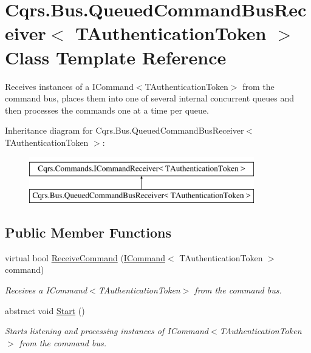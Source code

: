 \hypertarget{classCqrs_1_1Bus_1_1QueuedCommandBusReceiver}{}\section{Cqrs.\+Bus.\+Queued\+Command\+Bus\+Receiver$<$ T\+Authentication\+Token $>$ Class Template Reference}
\label{classCqrs_1_1Bus_1_1QueuedCommandBusReceiver}


Receives instances of a I\+Command$<$\+T\+Authentication\+Token$>$ from the command bus, places them into one of several internal concurrent queues and then processes the commands one at a time per queue.  


Inheritance diagram for Cqrs.\+Bus.\+Queued\+Command\+Bus\+Receiver$<$ T\+Authentication\+Token $>$\+:\begin{figure}[H]
\begin{center}
\leavevmode
\includegraphics[height=2.000000cm]{classCqrs_1_1Bus_1_1QueuedCommandBusReceiver}
\end{center}
\end{figure}
\subsection*{Public Member Functions}
\begin{DoxyCompactItemize}
\item 
virtual bool \hyperlink{classCqrs_1_1Bus_1_1QueuedCommandBusReceiver_aad9ab381afcc8346479ab9cabdf1046a_aad9ab381afcc8346479ab9cabdf1046a}{Receive\+Command} (\hyperlink{interfaceCqrs_1_1Commands_1_1ICommand}{I\+Command}$<$ T\+Authentication\+Token $>$ command)
\begin{DoxyCompactList}\small\item\em Receives a I\+Command$<$\+T\+Authentication\+Token$>$ from the command bus. \end{DoxyCompactList}\item 
abstract void \hyperlink{classCqrs_1_1Bus_1_1QueuedCommandBusReceiver_ad8bf3c1f9d9b0444cb85784cb9e59823_ad8bf3c1f9d9b0444cb85784cb9e59823}{Start} ()
\begin{DoxyCompactList}\small\item\em Starts listening and processing instances of I\+Command$<$\+T\+Authentication\+Token$>$ from the command bus. \end{DoxyCompactList}\end{DoxyCompactItemize}

